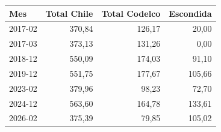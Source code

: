 \begin{tabular}{lrrr}
\toprule
Mes & Total Chile & Total Codelco & Escondida \\
\midrule
2017-02 & 370,84 & 126,17 & 20,00 \\
2017-03 & 373,13 & 131,26 & 0,00 \\
2018-12 & 550,09 & 174,03 & 91,10 \\
2019-12 & 551,75 & 177,67 & 105,66 \\
2023-02 & 379,96 & 98,23 & 72,70 \\
2024-12 & 563,60 & 164,78 & 133,61 \\
2026-02 & 375,39 & 79,85 & 105,02 \\
\bottomrule
\end{tabular}
